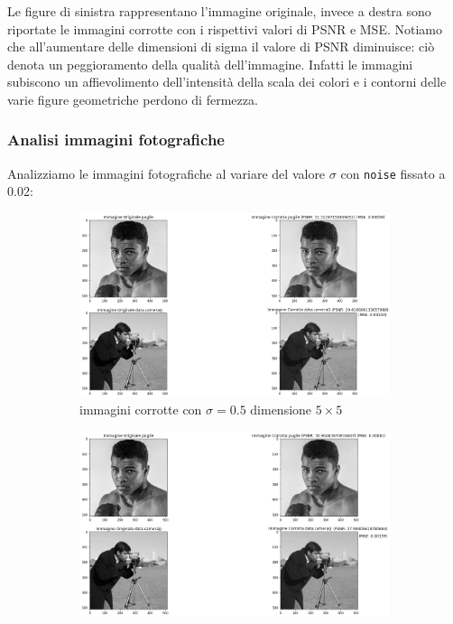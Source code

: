 Le figure di sinistra rappresentano l'immagine originale, invece a destra sono riportate le immagini corrotte 
con i rispettivi valori di PSNR e MSE. 
Notiamo che all'aumentare delle dimensioni di sigma il valore di PSNR diminuisce: ciò denota un peggioramento 
della qualità dell'immagine. Infatti le immagini subiscono un affievolimento dell'intensità della scala dei 
colori e i contorni delle varie figure geometriche perdono di fermezza. 

{\color{bblue}\subsubsection{Analisi immagini fotografiche}}
Analizziamo le immagini fotografiche al variare del valore $\sigma$ con \verb|noise| fissato a 0.02:
\begin{figure}[H]
    \centering
    \begin{subfigure}{0.67\textwidth}
        \centering
        \includegraphics[width=\textwidth]{confrontiPuntoUno/5-0.5-0.02.png}
        \caption{immagini corrotte con $\sigma = 0.5$ dimensione $5 \times 5$}
        \label{fig:fotogrCorrotte5x5}
    \end{subfigure}
    \begin{subfigure}{0.67\textwidth}
        \centering
        \includegraphics[width=\textwidth]{confrontiPuntoUno/7-1-0.02.png}

\end{subfigure}
\end{figure}
